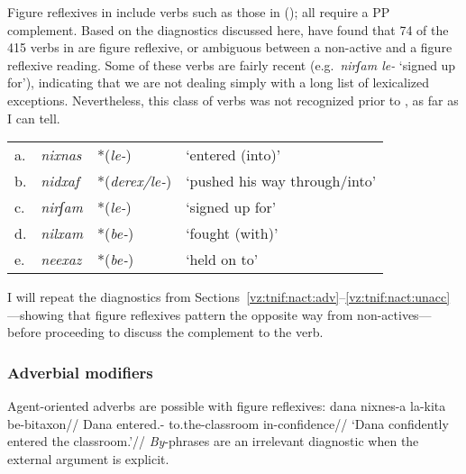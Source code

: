 
Figure reflexives in {\tnif} include verbs such as those in (\nextx); all require a PP complement. Based on the diagnostics discussed here, \cite{ahdoutkastner18} have found that 74 of the 415 verbs in {\tnif} are figure reflexive, or ambiguous between a non-active and a figure reflexive reading. Some of these verbs are fairly recent (e.g.~\emph{nirʃam le-} `signed up for'), indicating that we are not dealing simply with a long list of lexicalized exceptions. Nevertheless, this class of verbs was not recognized prior to \cite{kastner16phd}, as far as I can tell.
\ex\label{ex:vz:figrefl} \begin{tabular}{l>{\em}lll}
	a.& nixnas &  *(\emph{le-}) & `entered (into)'\\
	b.& nidxaf & *(\emph{derex/le-})  & `pushed his way through/into' \\
	c.& nirʃam & *(\emph{le-})  & `signed up for' \\
	d.& nilxam & *(\emph{be-}) & `fought (with)' \\
	e.& neexaz & *(\emph{be-}) & `held on to' \\
    \end{tabular}
\xe

I will repeat the diagnostics from Sections~\ref{vz:tnif:nact:adv}--\ref{vz:tnif:nact:unacc}---showing that figure reflexives pattern the opposite way from non-actives---before proceeding to discuss the complement to the verb.

		\subsubsection{Adverbial modifiers} \label{vz:tnif:figrefl:adv}
Agent-oriented adverbs are possible with figure reflexives:
\ex\label{ex:vz:nixnesa}\begingl
	\gla dana nixnes-a la-kita be-bitaxon//
	\glb Dana entered.- to.the-classroom in-confidence//
	\glft `Dana confidently entered the classroom.'//
	\endgl
\xe
\emph{By}-phrases are an irrelevant diagnostic when the external argument is explicit.

